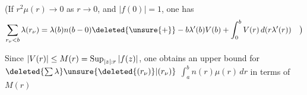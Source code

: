 (If $r^2\mu(r)\to0$ as $r\to0$, and $|f(0)|=1$, one has
\[
\sum_{r_\nu<b}\lambda(r_\nu)=\lambda(b)n(b-0)\deleted{\unsure{+}}-b\lambda'(b)V(b)+\int_0^b V(r)\,d(r\lambda'(r))\quad\big)
\]

Since $|V(r)|\leq M(r)=\mathop{\rm Sup}_{|z|:r}|f(z)|$, one obtains an
upper bound for $\deleted{\sum\lambda}\unsure{\deleted{(r_\nu)}|(r_\nu)}$ $\int_a^b n(r)\mu(r)\,dr$ in terms
of $M(r)$
